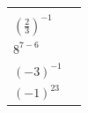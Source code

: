 {{\begin{center}
\begin{xtabular}[t]{|l|l|}
                 &
     \tabularnewline{}
                  \begin{math}{\left(\frac{2}{3}\right)}^{-1}\end{math}
                 &
     \tabularnewline{}
                  \begin{math}{8}^{7-6}\end{math}
                 &
     \tabularnewline{}
                  \begin{math}{\left(-3\right)}^{-1}\end{math}
                 &
     \tabularnewline{}
                  \begin{math}{\left(-1\right)}^{23}\end{math}

\end{xtabular}
\end{center}}}
